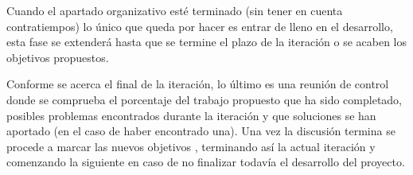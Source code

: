 Cuando el apartado organizativo esté terminado (sin tener en cuenta contratiempos) lo único 
que queda por hacer es entrar de lleno en el desarrollo, esta fase se extenderá hasta que
se termine el plazo de la iteración o se acaben los objetivos propuestos. 

Conforme se acerca el final de la iteración, lo último es una reunión de control donde 
se comprueba el porcentaje del trabajo propuesto que ha sido completado, posibles problemas 
encontrados durante la iteración y que soluciones se han aportado (en el caso de haber 
encontrado una). Una vez la discusión termina se procede a marcar las nuevos objetivos
, terminando así la actual iteración y comenzando la siguiente en caso de no finalizar 
todavía el desarrollo del proyecto.







